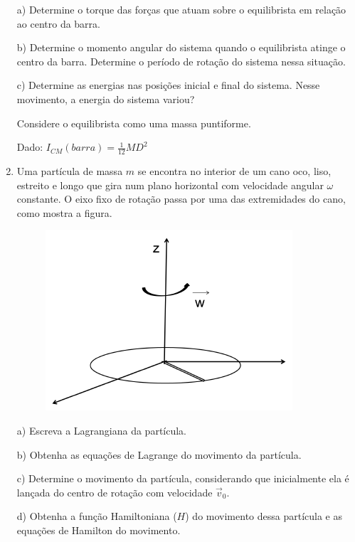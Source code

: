 \begin{enumerate}[start=1,label={\bfseries Q\arabic*.}]
a) Determine o torque das forças que atuam sobre o equilibrista em relação ao centro da barra.

\resposta

b) Determine o momento angular do sistema quando o equilibrista atinge o centro da barra. Determine o período de rotação do sistema nessa situação.

\resposta

c) Determine as energias nas posições inicial e final do sistema. Nesse movimento, a energia do sistema variou?

Considere o equilibrista como uma massa puntiforme.

Dado: $I_{CM}(barra) = \frac{1}{12} MD^{2}$

\resposta




\item Uma partícula de massa $m$ se encontra no interior de um cano oco, liso, estreito e longo que gira num plano horizontal com velocidade angular $\omega$ constante. O eixo fixo de rotação passa por uma das extremidades do cano, como mostra a figura.

\begin{figure}[H]
\centering
\includegraphics[scale=0.8]{classica-img/angular.png}
\end{figure}


a) Escreva a Lagrangiana da partícula.

\resposta

b) Obtenha as equações de Lagrange do movimento da partícula.

\resposta

c) Determine o movimento da partícula, considerando que inicialmente ela é lançada do centro de rotação com velocidade $\vec{v}_{0}$.

\resposta

d) Obtenha a função Hamiltoniana ($H$) do movimento dessa partícula e as equações de Hamilton do movimento.


\end{enumerate}
